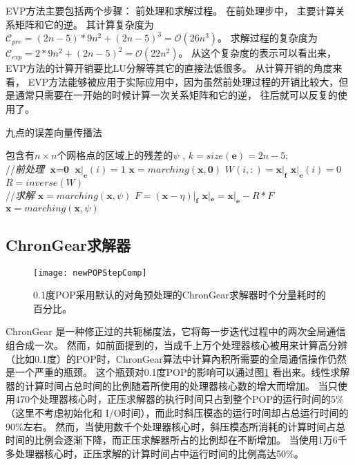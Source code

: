  
EVP方法主要包括两个步骤： 前处理和求解过程。 
在前处理步中， 主要计算关系矩阵和它的逆。 其计算复杂度为$\mathcal{C}_{pre}=
(2n-5)* 9n^2 + (2n-5)^3 = \mathcal {O} (26n^3)$。 
求解过程的复杂度为$\mathcal{C}_{evp}= 2* 9n^2 + (2n-5)^2 = \mathcal{O} (22n^2)$。 
从这个复杂度的表示可以看出来，EVP方法的计算开销要比LU分解等其它的直接法低很多。 
从计算开销的角度来看， EVP方法能够被应用于实际应用中，因为虽然前处理过程的开销比较大，但是通常只需要在一开始的时候计算一次关系矩阵和它的逆， 往后就可以反复的使用了。

\begin{algorithm}[t!]
\caption{九点的误差向量传播法}
\label{alg:evp}
\begin{algorithmic}[1]
\REQUIRE 包含有$n\times n$个网格点的区域上的残差的$\psi$ , $k = size(\textbf{e})=2n-5$; \\
//\qquad \textit{前处理}
\STATE  $\textbf{x} = \textbf{0}$
\STATE $\textbf{x}|_\textbf{e}(i) = 1$
\STATE $\textbf{x} = marching(\textbf{x},\textbf{0})$
\STATE $W(i,:) = \textbf{x}|_\textbf{f}$
\STATE $\textbf{x}|_\textbf{e}(i) = 0$
\ENDFOR
\STATE $R = inverse(W)$ \\
//\qquad \textit{求解 }
\STATE $\textbf{x}= marching(\textbf{x},\psi)$
\STATE $F = (\textbf{x} - \eta)|_\textbf{f}$
\STATE $\textbf{x}|_\textbf{e} =\textbf{x}|_\textbf{e} - R*F$
\STATE $\textbf{x} = marching(\textbf{x},\psi)$
\end{algorithmic}
\end{algorithm}

\subsection{ChronGear求解器}
\begin {figure}[!t]
\centering
\texttt{[image: newPOPStepComp]}
\caption[] {0.1度POP采用默认的对角预处理的ChronGear求解器时个分量耗时的百分比。\label{fig:StepComp}}
\end{figure}

ChronGear \cite{dAzevedo1999lapack} 是一种修正过的共轭梯度法，它将每一步迭代过程中的两次全局通信组合成一次。
然而，如前面提到的，当成千上万个处理器核心被用来计算高分辨（比如0.1度）的POP时，ChronGear算法中计算內积所需要的全局通信操作仍然是一个严重的瓶颈。
这个瓶颈对0.1度POP的影响可以通过图\ref{fig:StepComp} 看出来。线性求解器的计算时间占总时间的比例随着所使用的处理器核心数的增大而增加。
当只使用470个处理器核心时，正压求解器的执行时间只占到整个POP的运行时间的5\% （这里不考虑初始化和 I/O时间），而此时斜压模态的运行时间却占总运行时间的90\%左右。
然而，当使用数千个处理器核心时，斜压模态所消耗的计算时间占总时间的比例会逐渐下降，而正压求解器所占的比例却在不断增加。
当使用1万6千多处理器核心时，正压求解的计算时间占中运行时间的比例高达50\%。 

